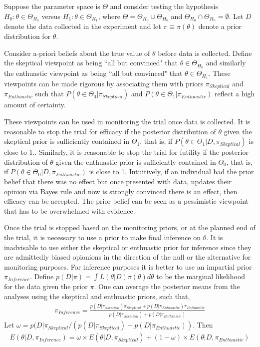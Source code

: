 \documentclass[12pt]{article}
\begin{document}
Suppose the parameter space is $\Theta$ and consider testing the hypothesis $H_0:\theta\in\Theta_{H_0}$ versus $H_1:\theta\in\Theta_{H_1}$, where $\Theta=\Theta_{H_0}\cup \Theta_{H_0}$ and $\Theta_{H_0}\cap \Theta_{H_0}=\emptyset$. Let $D$ denote the data collected in the experiment and let $\pi\equiv \pi(\theta)$ denote a prior distribution for $\theta$. 


Consider a-priori beliefs about the true value of $\theta$ before data is collected. Define the skeptical viewpoint as being ``all but convinced" that $\theta\in\Theta_{H_0}$ and similarly the enthuastic viewpoint as being ``all but convinced" that $\theta\in\Theta_{H_1}$. These viewpoints can be made rigorous by associating them with priors $\pi_{Skeptical}$ and $\pi_{Enthuastic}$ such that $P(\theta\in\Theta_0|\pi_{Skeptical})$ and $P(\theta\in\Theta_1|\pi_{Enthuastic})$ reflect a high amount of certainty.


These viewpoints can be used in monitoring the trial once data is collected. It is reasonable to stop the trial for efficacy if the posterior distribution of $\theta$ given the skeptical prior is sufficiently contained in $\Theta_1$, that is, if $P(\theta\in\Theta_1|D,\pi_{Skeptical})$ is close to 1.. Similarly, it is reasonable to stop the trial for futility if the posterior distribution of $\theta$ given the enthuastic prior is sufficiently contained in $\Theta_0$, that is, if $P(\theta\in\Theta_0|D,\pi_{Enthuastic})$ is close to 1. Intuitively, if an individual had the prior belief that there was no effect but once presented with data, updates their opinion via Bayes rule and now is strongly convinced there is an effect, then efficacy can be accepted. The prior belief can be seen as a pessimistic viewpoint that has to be overwhelmed with evidence.


Once the trial is stopped based on the monitoring priors, or at the planned end of the trial, it is necessary to use a prior to make final inference on $\theta$. It is inadvisable to use either the skeptical or enthuastic prior for inference since they are admittedly biased opionions in the direction of the null or the alternative for monitoring purposes. For inference purposes it is better to use an impartial prior $\pi_{Inference}$.  Define $p(D|\pi)=\int L (\theta|D)\pi(\theta)d\theta$ to be the marginal likelihood for the data given the prior $\pi$. One can average the posterior means from the analyses using the skeptical and enthuastic priors, such that,
\begin{align*}
\pi_{Inference}=\frac{p(D|\pi_{Skeptical})\pi_{Skeptical}+p(D|\pi_{Enthuastic})\pi_{Enthuastic}}{p(D|\pi_{Skeptical})+p(D|\pi_{Enthuastic})}
\end{align*}
Let $\omega=p(D|\pi_{Skeptical}/(p(D|\pi_{Skeptical})+p(D|\pi_{Enthuastic}))$. Then
\begin{align*}
E(\theta|D,\pi_{Inference})=\omega\times E(\theta|D,\pi_{Skeptical})+(1-\omega)\times E(\theta|D,\pi_{Enthuastic})
\end{align*}
\end{document}
